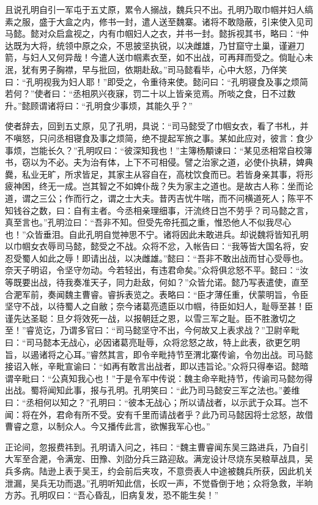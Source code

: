 且说孔明自引一军屯于五丈原，累令人搦战，魏兵只不出。孔明乃取巾帼并妇人缟素之服，盛于大盒之内，修书一封，遣人送至魏寨。诸将不敢隐蔽，引来使入见司马懿。懿对众启盒视之，内有巾帼妇人之衣，并书一封。懿拆视其书，略曰：“仲达既为大将，统领中原之众，不思披坚执锐，以决雌雄，乃甘窟守土巢，谨避刀箭，与妇人又何异哉！今遣人送巾帼素衣至，如不出战，可再拜而受之。倘耻心未泯，犹有男子胸襟，早与批回，依期赴敌。”司马懿看毕，心中大怒，乃佯笑曰：“孔明视我为妇人耶！”即受之，令重待来使。懿问曰：“孔明寝食及事之烦简若何？”使者曰：“丞相夙兴夜寐，罚二十以上皆亲览焉。所啖之食，日不过数升。”懿顾谓诸将曰：“孔明食少事烦，其能久乎？”

使者辞去，回到五丈原，见了孔明，具说：“司马懿受了巾帼女衣，看了书札，并不嗔怒，只问丞相寝食及事之烦简，绝不提起军旅之事。某如此应对，彼言：食少事烦，岂能长久？”孔明叹曰：“彼深知我也！”主簿杨顒谏曰：“某见丞相常自校簿书，窃以为不必。夫为治有体，上下不可相侵。譬之治家之道，必使仆执耕，婢典爨，私业无旷，所求皆足，其家主从容自在，高枕饮食而已。若皆身亲其事，将形疲神困，终无一成。岂其智之不如婢仆哉？失为家主之道也。是故古人称：坐而论道，谓之三公；作而行之，谓之士大夫。昔丙吉忧牛喘，而不问横道死人；陈平不知钱谷之数，曰：自有主者。今丞相亲理细事，汗流终日岂不劳乎？司马懿之言，真至言也。”孔明泣曰：“吾非不知。但受先帝托孤之重，惟恐他人不似我尽心也！”众皆垂泪。自此孔明自觉神思不宁。诸将因此未敢进兵。却说魏将皆知孔明以巾帼女衣辱司马懿，懿受之不战。众将不忿，入帐告曰：“我等皆大国名将，安忍受蜀人如此之辱！即请出战，以决雌雄。”懿曰：“吾非不敢出战而甘心受辱也。奈天子明诏，令坚守勿动。今若轻出，有违君命矣。”众将俱忿怒不平。懿曰：“汝等既要出战，待我奏准天子，同力赴敌，何如？”众皆允诺。懿乃写表遣使，直至合淝军前，奏闻魏主曹睿。睿拆表览之。表略曰：“臣才薄任重，伏蒙明旨，令臣坚守不战，以待蜀人之自敝；奈今诸葛亮遗臣以巾帼，待臣如妇人，耻辱至甚！臣谨先达圣聪：旦夕将效死一战，以报朝廷之恩，以雪三军之耻。臣不胜激切之至！”睿览讫，乃谓多官曰：“司马懿坚守不出，今何故又上表求战？”卫尉辛毗曰：“司马懿本无战心，必因诸葛亮耻辱，众将忿怒之故，特上此表，欲更乞明旨，以遏诸将之心耳。”睿然其言，即令辛毗持节至渭北寨传谕，令勿出战。司马懿接诏入帐，辛毗宣谕曰：“如再有敢言出战者，即以违旨论。”众将只得奉诏。懿暗谓辛毗曰：“公真知我心也！”于是令军中传说：魏主命辛毗持节，传谕司马懿勿得出战。蜀将闻知此事，报与孔明。孔明笑曰：“此乃司马懿安三军之法也。”姜维曰：“丞相何以知之？”孔明曰：“彼本无战心；所以请战者，以示武于众耳。岂不闻：将在外，君命有所不受。安有千里而请战者乎？此乃司马懿因将士忿怒，故借曹睿之意，以制众人。今又播传此言，欲懈我军心也。”

正论间，忽报费祎到。孔明请入问之，祎曰：“魏主曹睿闻东吴三路进兵，乃自引大军至合淝，令满宠、田豫、刘劭分兵三路迎敌。满宠设计尽烧东吴粮草战具，吴兵多病。陆逊上表于吴王，约会前后夹攻，不意赍表人中途被魏兵所获，因此机关泄漏，吴兵无功而退。”孔明听知此信，长叹一声，不觉昏倒于地；众将急救，半晌方苏。孔明叹曰：“吾心昏乱，旧病复发，恐不能生矣！”

